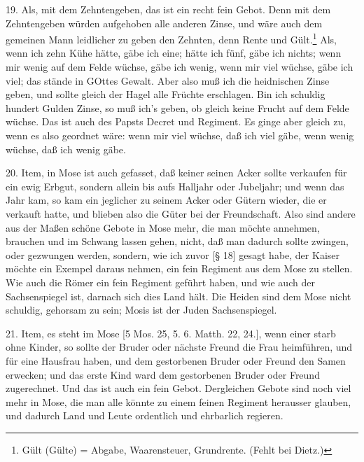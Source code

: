 19. Als, mit dem Zehntengeben, das ist ein recht fein Gebot. Denn mit dem Zehntengeben würden aufgehoben alle anderen Zinse, und wäre auch dem gemeinen Mann leidlicher zu geben den Zehnten, denn Rente und Gült.\footnote{Gült (Gülte) = Abgabe, Waarensteuer, Grundrente. (Fehlt bei Dietz.)} Als, wenn ich zehn Kühe hätte, gäbe ich eine; hätte ich fünf, gäbe ich nichts; wenn mir wenig auf dem Felde wüchse, gäbe ich wenig, wenn mir viel wüchse, gäbe ich viel; das stände in GOttes Gewalt. Aber also muß ich die heidnischen Zinse geben, und sollte gleich der Hagel alle Früchte erschlagen. Bin ich schuldig hundert Gulden Zinse, so muß ich’s geben, ob gleich keine Frucht auf dem Felde wüchse. Das ist auch des Papsts Decret und Regiment. Es ginge aber gleich zu, wenn es also geordnet wäre: wenn mir viel wüchse, daß ich viel gäbe, wenn wenig wüchse, daß ich wenig gäbe.

20. Item, in Mose ist auch gefasset, daß keiner seinen Acker sollte verkaufen für ein ewig Erbgut, sondern allein bis aufs Halljahr oder Jubeljahr; und wenn das Jahr kam, so kam ein jeglicher zu seinem Acker oder Gütern wieder, die er verkauft hatte, und blieben also die Güter bei der Freundschaft. Also sind andere aus der Maßen schöne Gebote in Mose mehr, die man möchte annehmen, brauchen und im Schwang lassen gehen, nicht, daß man dadurch sollte zwingen, oder gezwungen werden, sondern, wie ich zuvor [§ 18] gesagt habe, der Kaiser möchte ein Exempel daraus nehmen, ein fein Regiment aus dem Mose zu stellen. Wie auch die Römer ein fein Regiment geführt haben, und wie auch der Sachsenspiegel ist, darnach sich dies Land hält. Die Heiden sind dem Mose nicht schuldig, gehorsam zu sein; Mosis ist der Juden Sachsenspiegel.

21. Item, es steht im Mose [5 Mos. 25, 5. 6. Matth. 22, 24.], wenn einer starb ohne Kinder, so sollte der Bruder oder nächste Freund die Frau heimführen, und für eine Hausfrau haben, und dem gestorbenen Bruder oder Freund den Samen erwecken; und das erste Kind ward dem gestorbenen Bruder oder Freund zugerechnet. Und das ist auch ein fein Gebot. Dergleichen Gebote sind noch viel mehr in Mose, die man alle könnte zu einem feinen Regiment herausser glauben, und dadurch Land und Leute ordentlich und ehrbarlich regieren.

